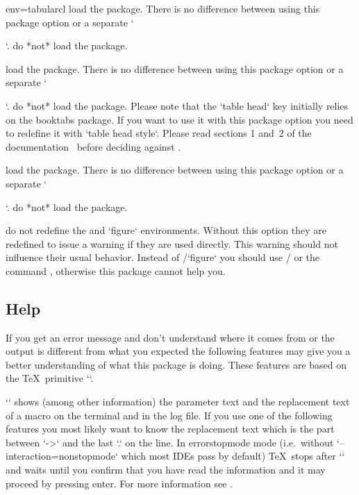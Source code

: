 \begin{tableobject}{env=tabular}{cl}
 load the  package.
  There is no difference between using this package option or a separate `\usepackage{array}`.
 do *not* load the  package.

 load the  package.
  There is no difference between using this package option or a separate `\usepackage{booktabs}`.
 do *not* load the  package.
  Please note that the `table head` key initially relies on the booktabs package.
  If you want to use it with this package option you need to redefine it with `table head style`.
  Please read sections 1 and~2 of the  documentation~\autocite{booktabs} before deciding against .

 load the  package.
  There is no difference between using this package option or a separate `\usepackage{longtable}`.
 do *not* load the  package.

 do not redefine the  and `figure` environments.
  Without this option they are redefined to issue a warning if they are used directly.
  This warning should not influence their usual behavior.
  Instead of \slash `figure` you should use \slash {} or the command ,
  otherwise this package cannot help you.
\endpkgoptndoc


\subsection{Help}
\label{help}

If you get an error message and don't understand where it comes from
or the output is different from what you expected
the following features may give you a better understanding of what this package is doing.
These features are based on the \TeX\ primitive `\show`.

\DescribeMacro{\show}
`\show` shows (among other information) the parameter text and the replacement text of a macro on the terminal and in the log file.
If you use one of the following features you most likely want to know the replacement text which is the part between `->` and the last `.` on the line.
In errorstopmode mode (i.e.\ without `--interaction=nonstopmode` which most IDEs pass by default) \TeX\ stops after `\show` and waits until you confirm that you have read the information and it may proceed by pressing enter.
For more information see .


\end{tableobject}

